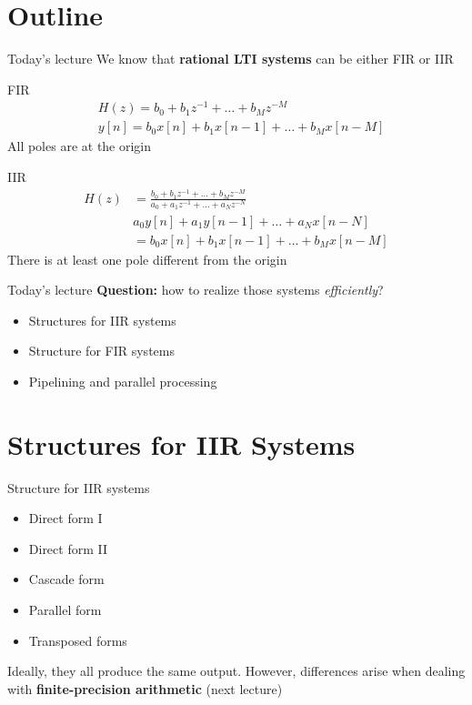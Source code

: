 \documentclass[10pt]{beamer}
\begin{document}
\section{Outline}
%
\begin{frame}{Today's lecture}
We know that \textbf{rational LTI systems} can be either FIR or IIR
\begin{block}{FIR}
	\vspace{-0.5cm}
	\begin{align}
		&H(z) =  b_0 + b_1z^{-1} + \ldots + b_Mz^{-M} \tag{$z$-transform} \\
		&y[n] = b_0x[n] + b_1x[n-1] + \ldots + b_Mx[n-M] \tag{difference equation}
	\end{align}
	All poles are at the origin
\end{block}

\begin{block}{IIR}
	\vspace{-0.5cm}
	\begin{align*}
	H(z) &=  \frac{b_0 + b_1z^{-1} + \ldots + b_Mz^{-M}}{a_0 + a_1z^{-1} + \ldots + a_Nz^{-N}} \tag{$z$-transform} \\
	&a_0y[n] + a_1y[n-1] + \ldots + a_Nx[n-N]  \\
	&= b_0x[n] + b_1x[n-1] + \ldots + b_Mx[n-M] \tag{difference equation}
	\end{align*}
	There is at least one pole different from the origin
\end{block}

\end{frame}

%
\begin{frame}{Today's lecture}
	\textbf{Question:} how to realize those systems \textit{efficiently}?
	
	\begin{itemize}
		\item Structures for IIR systems
		\item Structure for FIR systems
		\item Pipelining and parallel processing
	\end{itemize}
\end{frame}

%
\section{Structures for IIR Systems}
\begin{frame}{Structure for IIR systems}
	\begin{itemize}
		\item Direct form I
		\item Direct form II
		\item Cascade form
		\item Parallel form
		\item Transposed forms
	\end{itemize}

	Ideally, they all produce the same output. However, differences arise when dealing with \textbf{finite-precision arithmetic} (next lecture)
\end{frame}
\end{document}
